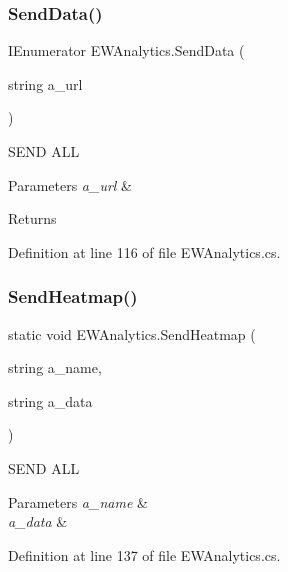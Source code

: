 \subsubsection{\texorpdfstring{Send\+Data()}{SendData()}}
{\footnotesize\ttfamily I\+Enumerator E\+W\+Analytics.\+Send\+Data (\begin{DoxyParamCaption}\item[{string}]{a\+\_\+url }\end{DoxyParamCaption})}



S\+E\+ND A\+LL 


\begin{DoxyParams}{Parameters}
{\em a\+\_\+url} & \\
\hline
\end{DoxyParams}
\begin{DoxyReturn}{Returns}

\end{DoxyReturn}


Definition at line 116 of file E\+W\+Analytics.\+cs.

\mbox{\label{class_e_w_analytics_aa97cecf6553604b7d2e0200cfb4b0f75}} 
\subsubsection{\texorpdfstring{Send\+Heatmap()}{SendHeatmap()}}
{\footnotesize\ttfamily static void E\+W\+Analytics.\+Send\+Heatmap (\begin{DoxyParamCaption}\item[{string}]{a\+\_\+name,  }\item[{string}]{a\+\_\+data }\end{DoxyParamCaption})\hspace{0.3cm}{\ttfamily [static]}}



S\+E\+ND A\+LL 


\begin{DoxyParams}{Parameters}
{\em a\+\_\+name} & \\
\hline
{\em a\+\_\+data} & \\
\hline
\end{DoxyParams}


Definition at line 137 of file E\+W\+Analytics.\+cs.

\mbox{\label{class_e_w_analytics_a39edda10ecc7559f4a2919fcc9342163}} 
